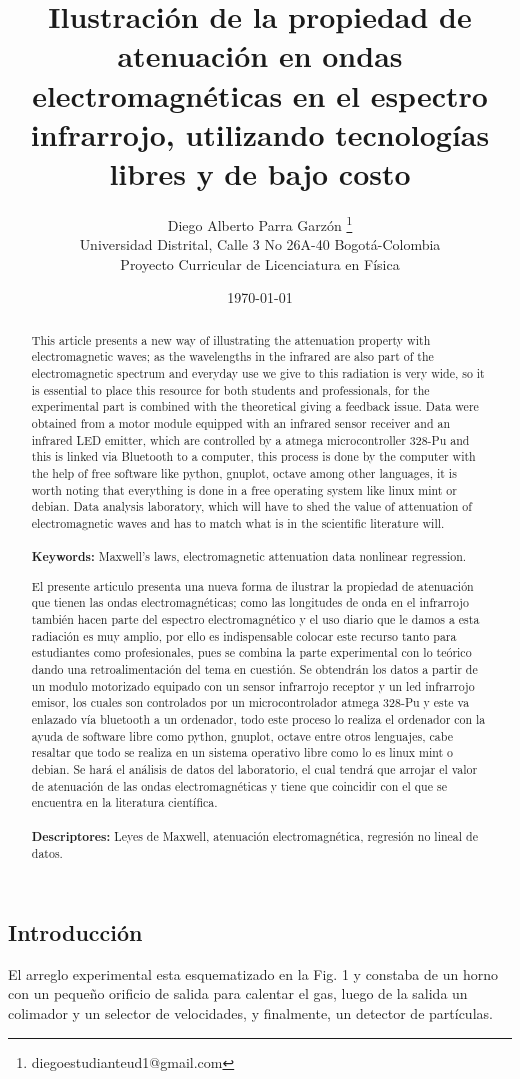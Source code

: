 \documentclass[12]{article}
\title{\bf{Ilustración de la propiedad de atenuación en ondas electromagnéticas en el espectro infrarrojo, utilizando tecnologías libres y de bajo costo}}
\author{Diego Alberto Parra Garzón \footnote{diegoestudianteud1@gmail.com} \\ Universidad Distrital, Calle 3 No 26A-40 Bogotá-Colombia \\    Proyecto Curricular de Licenciatura en Física }
\date{\today}
\def\tablename{Tabla}%
\begin{document}
\renewcommand{\tablename}{Tabla}
\maketitle
\vspace{-0.8cm}
\begin{abstract}
This article presents a new way of illustrating the attenuation property with electromagnetic waves; as the wavelengths in the infrared are also part of the electromagnetic spectrum and everyday use we give to this radiation is very wide, so it is essential to place this resource for both students and professionals, for the experimental part is combined with the theoretical giving a feedback issue. Data were obtained from a motor module equipped with an infrared sensor receiver and an infrared LED emitter, which are controlled by a atmega microcontroller 328-Pu and this is linked via Bluetooth to a computer, this process is done by the computer with the help of free software like python, gnuplot, octave among other languages, it is worth noting that everything is done in a free operating system like linux mint or debian. Data analysis laboratory, which will have to shed the value of attenuation of electromagnetic waves and has to match what is in the scientific literature will.\\ \\
{\bf{Keywords:}} Maxwell's laws, electromagnetic attenuation data nonlinear regression.
\end{abstract}
\begin{abstract}
El presente articulo presenta una nueva forma de ilustrar la propiedad de atenuación que tienen las ondas electromagnéticas; como las longitudes de onda en el  infrarrojo también hacen parte del espectro electromagnético y el uso diario que le damos a esta radiación es muy amplio, por ello es indispensable colocar este recurso tanto para estudiantes como profesionales, pues se combina la parte experimental con lo teórico dando una retroalimentación del tema en cuestión. Se obtendrán los datos a partir de un modulo motorizado equipado con un sensor infrarrojo receptor y un led infrarrojo emisor, los cuales son controlados por un microcontrolador atmega 328-Pu y este va enlazado vía bluetooth a un ordenador, todo este proceso lo realiza el ordenador con la ayuda de software libre como python, gnuplot, octave entre otros lenguajes, cabe resaltar que todo se realiza en un sistema operativo libre como lo es linux mint o debian. Se hará el análisis de datos del laboratorio, el cual tendrá que arrojar el valor de atenuación de las ondas electromagnéticas y tiene que coincidir con el que se encuentra en la literatura científica.\\ \\
{\bf{Descriptores:}} Leyes de Maxwell, atenuación electromagnética, regresión no lineal de datos.
\end{abstract}
\begin{multicols}{2}
\section{Introducción}
El arreglo experimental esta esquematizado en la Fig. 1 y constaba de un horno con un pequeño orificio de salida para calentar el gas, luego de la salida un colimador y un selector de velocidades, y finalmente, un detector de partículas.
\end{multicols}
\end{document}
